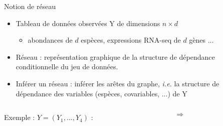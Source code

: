 \documentclass[11pt]{bredelebeamer}
\begin{document}
\begin{frame}{Notion de réseau}
    \begin{itemize}
    \item Tableau de données observées Y de dimensions $n\times d$
    \begin{itemize}
        \item abondances de $d$ espèces, expressions RNA-seq de $d$ gènes ...\vspace{0.3cm}
    \end{itemize}
    
     \item Réseau : représentation graphique de la structure de dépendance conditionnelle du jeu de données.\vspace{0.3cm}
     
      \item Inférer un réseau : inférer les arêtes du graphe, \textit{i.e.} la structure de dépendance des variables (espèces, covariables, ...) de Y
    \end{itemize}

    \vspace{0.5cm}
\begin{columns}
 \begin{column}{0.35\linewidth}
 
Exemple : $Y=(Y_1,...,Y_4)$ : \\
 \begin{flushright}
 \\
\end{flushright}
\end{column}
\begin{column}{0.1\linewidth}
\begin{center}
\vspace{-0.5cm}
 $\Rightarrow$
\end{center}
\end{column}


\end{columns}
\end{frame}
\end{document}
